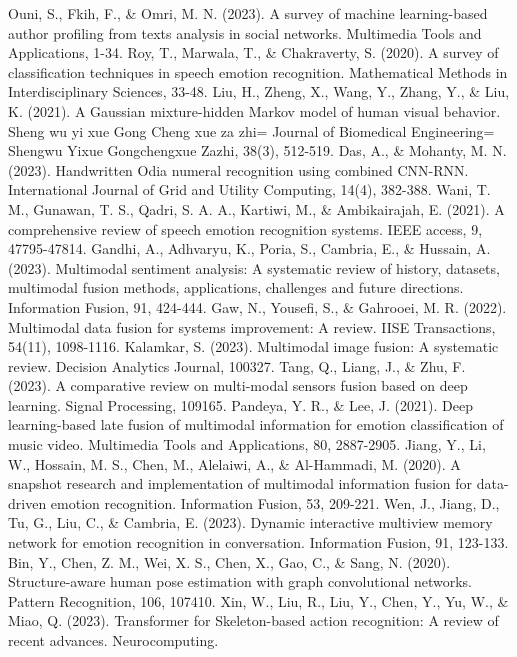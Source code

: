 \documentclass[preprint,12pt]{elsarticle}
\begin{document}
\begin{thebibliography}{99}
 Ouni, S., Fkih, F., \& Omri, M. N. (2023). A survey of machine learning-based author profiling from texts analysis in social networks. Multimedia Tools and Applications, 1-34.
 Roy, T., Marwala, T., \& Chakraverty, S. (2020). A survey of classification techniques in speech emotion recognition. Mathematical Methods in Interdisciplinary Sciences, 33-48.
 Liu, H., Zheng, X., Wang, Y., Zhang, Y., \& Liu, K. (2021). A Gaussian mixture-hidden Markov model of human visual behavior. Sheng wu yi xue Gong Cheng xue za zhi= Journal of Biomedical Engineering= Shengwu Yixue Gongchengxue Zazhi, 38(3), 512-519.
 Das, A., \& Mohanty, M. N. (2023). Handwritten Odia numeral recognition using combined CNN-RNN. International Journal of Grid and Utility Computing, 14(4), 382-388.
 Wani, T. M., Gunawan, T. S., Qadri, S. A. A., Kartiwi, M., \& Ambikairajah, E. (2021). A comprehensive review of speech emotion recognition systems. IEEE access, 9, 47795-47814.
 Gandhi, A., Adhvaryu, K., Poria, S., Cambria, E., \& Hussain, A. (2023). Multimodal sentiment analysis: A systematic review of history, datasets, multimodal fusion methods, applications, challenges and future directions. Information Fusion, 91, 424-444.
 Gaw, N., Yousefi, S., \& Gahrooei, M. R. (2022). Multimodal data fusion for systems improvement: A review. IISE Transactions, 54(11), 1098-1116.
 Kalamkar, S. (2023). Multimodal image fusion: A systematic review. Decision Analytics Journal, 100327.
 Tang, Q., Liang, J., \& Zhu, F. (2023). A comparative review on multi-modal sensors fusion based on deep learning. Signal Processing, 109165.
 Pandeya, Y. R., \& Lee, J. (2021). Deep learning-based late fusion of multimodal information for emotion classification of music video. Multimedia Tools and Applications, 80, 2887-2905.
 Jiang, Y., Li, W., Hossain, M. S., Chen, M., Alelaiwi, A., \& Al-Hammadi, M. (2020). A snapshot research and implementation of multimodal information fusion for data-driven emotion recognition. Information Fusion, 53, 209-221.
 Wen, J., Jiang, D., Tu, G., Liu, C., \& Cambria, E. (2023). Dynamic interactive multiview memory network for emotion recognition in conversation. Information Fusion, 91, 123-133.
 Bin, Y., Chen, Z. M., Wei, X. S., Chen, X., Gao, C., \& Sang, N. (2020). Structure-aware human pose estimation with graph convolutional networks. Pattern Recognition, 106, 107410.
 Xin, W., Liu, R., Liu, Y., Chen, Y., Yu, W., \& Miao, Q. (2023). Transformer for Skeleton-based action recognition: A review of recent advances. Neurocomputing.

\end{thebibliography}
\end{document}
